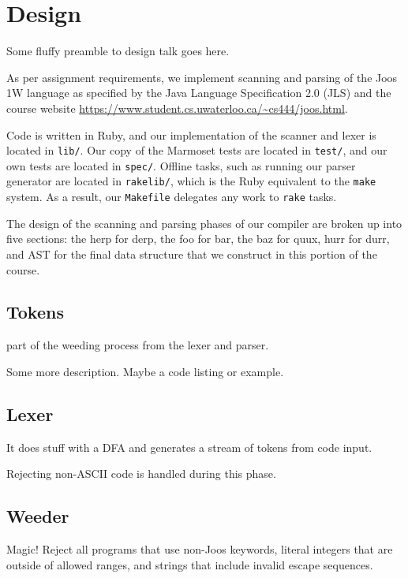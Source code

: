 \documentclass[pdftex,12pt,a4paper]{article}
\begin{document}

\section{Design}

Some fluffy preamble to design talk goes here.

As per assignment requirements, we implement scanning and parsing of
the Joos 1W language as specified by the Java Language Specification
2.0 (JLS) and the course website
\url{https://www.student.cs.uwaterloo.ca/~cs444/joos.html}.

Code is written in Ruby, and our implementation of the scanner and
lexer is located in \texttt{lib/}. Our copy of the Marmoset tests are
located in \texttt{test/}, and our own tests are located in
\texttt{spec/}. Offline tasks, such as running our parser generator
are located in \texttt{rakelib/}, which is the Ruby equivalent to the
\texttt{make} system. As a result, our \texttt{Makefile} delegates any
work to \texttt{rake} tasks.

The design of the scanning and parsing phases of our compiler are
broken up into five sections: the herp for derp, the foo for bar, the
baz for quux, hurr for durr, and AST for the final data structure that
we construct in this portion of the course.


\subsection{Tokens}
part of the weeding process from the lexer and parser.

Some more description. Maybe a code listing or example.


\subsection{Lexer}

It does stuff with a DFA and generates a stream of tokens from code
input.

Rejecting non-ASCII code is handled during this phase.


\subsection{Weeder}

Magic! Reject all programs that use non-Joos keywords, literal
integers that are outside of allowed ranges, and strings that include
invalid escape sequences.
\end{document}
